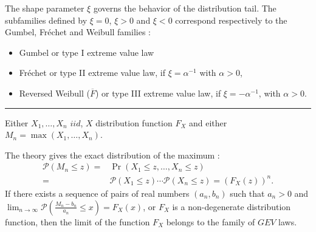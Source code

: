 \begin{f}
\end{f}

\begin{f}

The shape parameter \(\xi\) governs the behavior of the distribution tail.
The subfamilies defined by \(\xi= 0\), \(\xi>0\) and \(\xi<0\) correspond respectively to the Gumbel, Fréchet and Weibull families :
\begin{itemize}
\item 	 Gumbel or type I extreme value law
\item     Fréchet or type II extreme value law, if \(\xi  = \alpha^{-1}\) with \(\alpha>0\),
\item    Reversed Weibull (\(\overline{F}\)) or type III extreme value law, if \(\xi =-\alpha^{-1} \), with \(\alpha>0\).
\end{itemize}
\end{f}
\hrule 

\begin{f} 

	Either \(X_1, \dots, X_n\)  \(iid\), \(X\) distribution function \(F_X\) and either \(M_n =\max(X_1,\dots,X_n)\).
	
	The theory gives the exact distribution of the maximum :
\begin{align*}
		\mathcal{P}(M_n \leq z) = &\Pr(X_1 \leq z, \dots, X_n \leq z) \\
		 = &\mathcal{P}(X_1 \leq z) \cdots \mathcal{P}(X_n \leq z) = (F_X(z))^n. 
\end{align*}
	If there exists a sequence of pairs of real numbers \((a_n, b_n)\) such that \(a_n>0\) and \(\lim_{n \to \infty}\mathcal{P}\left(\frac{M_n-b_n}{a_n}\leq x\right) = F_X(x)\), or \(F_X\) is a non-degenerate distribution function, then the limit of the function \(F_X\) belongs to the family of \(GEV\) laws. 

\end{f}

